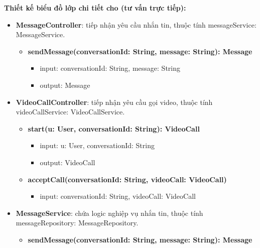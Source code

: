 \textbf{Thiết kế biểu đồ lớp chi tiết cho  (tư vấn trực tiếp):}
\begin{itemize}[label=\textbullet, itemsep=0.4em]
  \item \textbf{MessageController}: tiếp nhận yêu cầu nhắn tin, thuộc tính messageService: MessageService.
  \begin{itemize}[label=$\circ$, itemsep=0.2em, leftmargin=1.5em]
    \item \textbf{sendMessage(conversationId: String, message: String): Message}
    \begin{itemize}[label=$\blacksquare$, itemsep=0.1em, leftmargin=1.5em]
      \item input: conversationId: String, message: String
      \item output: Message
    \end{itemize}
  \end{itemize}
  \item \textbf{VideoCallController}: tiếp nhận yêu cầu gọi video, thuộc tính videoCallService: VideoCallService.
  \begin{itemize}[label=$\circ$, itemsep=0.2em, leftmargin=1.5em]
    \item \textbf{start(u: User, conversationId: String): VideoCall}
    \begin{itemize}[label=$\blacksquare$, itemsep=0.1em, leftmargin=1.5em]
      \item input: u: User, conversationId: String
      \item output: VideoCall
    \end{itemize}
    \item \textbf{acceptCall(conversationId: String, videoCall: VideoCall)}
    \begin{itemize}[label=$\blacksquare$, itemsep=0.1em, leftmargin=1.5em]
      \item input: conversationId: String, videoCall: VideoCall
    \end{itemize}
  \end{itemize}
  \item \textbf{MessageService}: chứa logic nghiệp vụ nhắn tin, thuộc tính messageRepository: MessageRepository.
  \begin{itemize}[label=$\circ$, itemsep=0.2em, leftmargin=1.5em]
    \item \textbf{sendMessage(conversationId: String, message: String): Message}
    \begin{itemize}[label=$\blacksquare$, itemsep=0.1em, leftmargin=1.5em]

\end{itemize}
\end{itemize}
\end{itemize}
